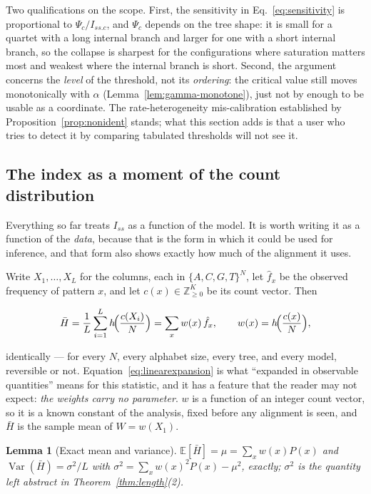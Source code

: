 \documentclass[preprint,12pt,authoryear]{elsarticle}
\newcommand{\Iss}{I_{ss}}
\newcommand{\Issc}{I_{ss.c}}
\newcommand{\Hbar}{\bar H}
\newcommand{\E}{\mathbb{E}}
\newcommand{\Var}{\operatorname{Var}}
\newtheorem{lemma}[theorem]{Lemma}
\theoremstyle{definition}
\theoremstyle{remark}
\begin{document}
Two qualifications on the scope. First, the sensitivity in
Eq.~\eqref{eq:sensitivity} is proportional to $\Psi_c/\Issc$, and $\Psi_c$
depends on the tree shape: it is small for a quartet with a long internal
branch and larger for one with a short internal branch, so the collapse is
sharpest for the configurations where saturation matters most and weakest
where the internal branch is short. Second, the argument concerns the
\emph{level} of the threshold, not its \emph{ordering}: the critical value
still moves monotonically with $\alpha$ (Lemma~\ref{lem:gamma-monotone}), just
not by enough to be usable as a coordinate. The rate-heterogeneity
mis-calibration established by Proposition~\ref{prop:nonident} stands; what
this section adds is that a user who tries to detect it by comparing tabulated
thresholds will not see it.

\subsection{The index as a moment of the count distribution}
\label{sec:moment}

Everything so far treats $\Iss$ as a function of the model. It is worth
writing it as a function of the \emph{data}, because that is the form in
which it could be used for inference, and that form also shows exactly how
much of the alignment it uses.

Write $X_1,\dots,X_L$ for the columns, each in $\{A,C,G,T\}^N$, let
$\hat f_x$ be the observed frequency of pattern $x$, and let
$c(x)\in\mathbb Z_{\ge0}^{K}$ be its count vector. Then

\begin{equation}
  \Hbar=\frac1L\sum_{i=1}^L h\!\Bigl(\frac{c(X_i)}{N}\Bigr)
      =\sum_{x}w(x)\,\hat f_x,
  \qquad w(x)=h\!\Bigl(\frac{c(x)}{N}\Bigr),
  \label{eq:linearexpansion}
\end{equation}

identically --- for every $N$, every alphabet size, every tree, and every
model, reversible or not. Equation~\eqref{eq:linearexpansion} is what
``expanded in observable quantities'' means for this statistic, and it has a
feature that the reader may not expect: \emph{the weights carry no
parameter}. $w$ is a function of an integer count vector, so it is a known
constant of the analysis, fixed before any alignment is seen, and $\Hbar$ is
the sample mean of $W=w(X_1)$.

\begin{lemma}[Exact mean and variance]
\label{lem:moment}
$\E[\Hbar]=\mu=\sum_xw(x)P(x)$ and
$\Var(\Hbar)=\sigma^2/L$ with
$\sigma^2=\sum_xw(x)^2P(x)-\mu^2$, exactly; $\sigma^2$ is the quantity left
abstract in Theorem~\ref{thm:length}(2).
\end{lemma}
\end{document}
